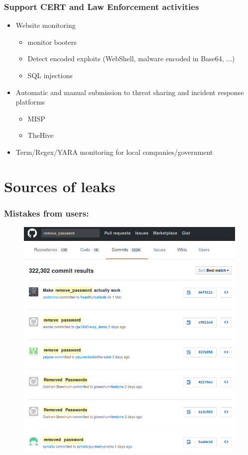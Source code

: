 \documentclass{beamer}
\begin{document}
\begin{frame}
    \frametitle{Support CERT and Law Enforcement activities}
    	\begin{itemize}
		    \item Website monitoring
		    	\begin{itemize}
				    \item monitor booters
				    \item Detect encoded exploits (WebShell, malware encoded in Base64, ...)
				    \item SQL injections
		    	\end{itemize}
		    \item Automatic and manual submission to threat sharing and incident
response platforms
			\begin{itemize}
				\item MISP
				\item TheHive
			\end{itemize}
		    \item Term/Regex/YARA monitoring for local companies/government
        \end{itemize}
\end{frame}

\section{Sources of leaks}

\begin{frame}
    \frametitle{Mistakes from users:}
        \begin{figure}
            \includegraphics[scale=0.4]{images/git-pass.png}
        \end{figure}
\end{frame}
\end{document}
